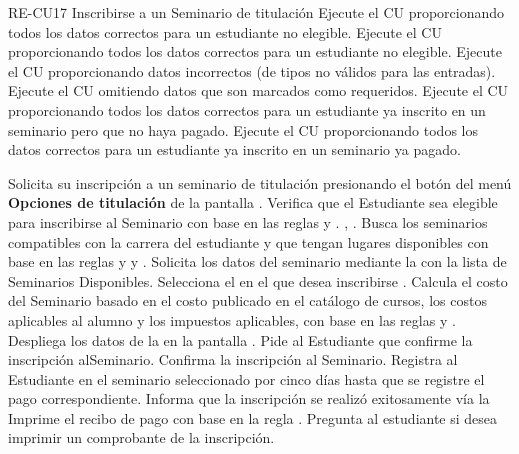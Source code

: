\begin{UseCase}{%
	RE-CU17%
}{
	Inscribirse a un Seminario de titulación
}
{		\Titem Ejecute el CU proporcionando todos los datos correctos para un estudiante no elegible.
		\Titem Ejecute el CU proporcionando todos los datos correctos para un estudiante no elegible.
		\Titem Ejecute el CU proporcionando datos incorrectos (de tipos no válidos para las entradas).
		\Titem Ejecute el CU omitiendo datos que son marcados como requeridos.
		\Titem Ejecute el CU proporcionando todos los datos correctos para un estudiante ya inscrito en un seminario pero que no haya pagado.
		\Titem Ejecute el CU proporcionando todos los datos correctos para un estudiante ya inscrito en un seminario ya pagado.
	}
\end{UseCase}

\begin{UCtrayectoria}
	\UCpaso[\UCactor] Solicita su inscripción a un seminario de titulación presionando el botón  del menú {\bf Opciones de titulación} de la pantalla \label{RE-CU-17-Solicita-inscripcion}.
		\UCpaso Verifica que el Estudiante sea elegible para inscribirse al Seminario con base en las reglas  y . , .
		\UCpaso Busca los seminarios compatibles con la carrera del estudiante y que tengan lugares disponibles con base en las reglas  y   y .
		\UCpaso Solicita los datos del seminario mediante la  con la lista de Seminarios Disponibles.
		\UCpaso[\UCactor] Selecciona el {\sc{}} en el que desea inscribirse \label{RE-CU-17-SeleccionarSeminario}.
		\UCpaso Calcula el costo del Seminario basado en el costo publicado en el catálogo de cursos, los costos aplicables al alumno y los impuestos aplicables, con base en las reglas  y .
		\UCpaso Despliega los datos de la {\sc{}} en la pantalla .
		\UCpaso Pide al Estudiante que confirme la inscripción alSeminario.
		\UCpaso[\UCactor] Confirma la inscripción al Seminario.
		\UCpaso Registra al Estudiante en el seminario seleccionado por cinco días hasta que se registre el pago correspondiente.
		\UCpaso Informa que la inscripción se realizó exitosamente vía la 
		\UCpaso Imprime el recibo de pago con base en la regla .
		\UCpaso Pregunta al estudiante si desea imprimir un comprobante de la inscripción.
\end{UCtrayectoria}

